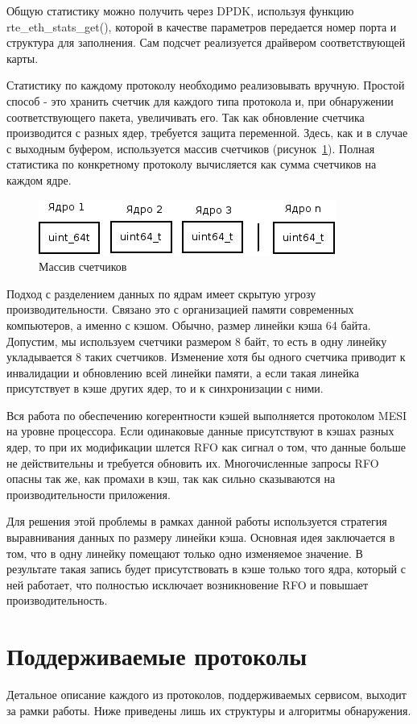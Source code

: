 Общую статистику можно получить через DPDK, используя функцию rte\_eth\_stats\_get(), которой в качестве параметров передается номер порта и структура для заполнения. Сам подсчет реализуется драйвером соответствующей карты.

Статистику по каждому протоколу необходимо реализовывать вручную. Простой способ - это хранить счетчик для каждого типа протокола и, при обнаружении соответствующего пакета, увеличивать его. Так как обновление счетчика производится с разных ядер, требуется защита переменной. Здесь, как и в случае с выходным буфером, используется массив счетчиков (рисунок~\ref{pic:counters}). Полная статистика по конкретному протоколу вычисляется как сумма счетчиков на каждом ядре.
\begin{figure}
\centering
\includegraphics[scale=0.6]{pictures/counters}
\caption{Массив счетчиков}
\label{pic:counters}
\end{figure}

Подход с разделением данных по ядрам имеет скрытую угрозу производительности. Связано это с организацией памяти современных компьютеров, а именно с кэшом. Обычно, размер линейки кэша 64 байта. Допустим, мы используем счетчики размером 8 байт, то есть в одну линейку укладывается 8 таких счетчиков. Изменение хотя бы одного счетчика приводит к инвалидации и обновлению всей линейки памяти, а если такая линейка присутствует в кэше других ядер, то и к синхронизации с ними.

Вся работа по обеспечению когерентности кэшей выполняется протоколом MESI на уровне процессора. Если одинаковые данные присутствуют в кэшах разных ядер, то при их модификации шлется RFO как сигнал о том, что данные больше не действительны и требуется обновить их. Многочисленные запросы RFO опасны так же, как промахи в кэш, так как сильно сказываются на производительности приложения.

Для решения этой проблемы в рамках данной работы используется стратегия выравнивания данных по размеру линейки кэша. Основная идея заключается в том, что в одну линейку помещают только одно изменяемое значение. В результате такая запись будет присутствовать в кэше только того ядра, который с ней работает, что полностью исключает возникновение RFO и повышает производительность.

\section{Поддерживаемые протоколы}
Детальное описание каждого из протоколов, поддерживаемых сервисом, выходит за рамки работы. Ниже приведены лишь их структуры и алгоритмы обнаружения.

